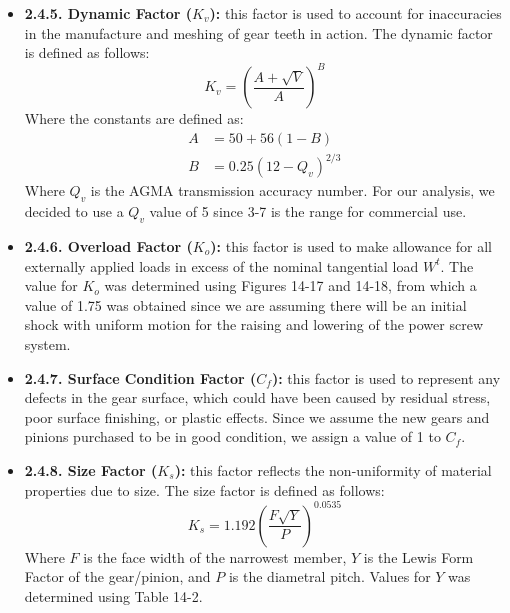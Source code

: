 \documentclass[letterpaper,12pt]{article}
\begin{document}
\begin{itemize}[leftmargin=3mm]
    \item \textbf{2.4.5. Dynamic Factor ($K_v$):} this factor is used to account for inaccuracies in the manufacture and meshing of gear teeth in action. The dynamic factor is defined as follows:
    \begin{equation}
        K_v = \left(\dfrac{A + \sqrt{V}}{A}\right)^B
    \end{equation}
    Where the constants are defined as:
    \begin{align*}
        A &= 50 + 56(1-B) \\
        B &= 0.25(12-Q_v)^{2/3}
    \end{align*}
    Where $Q_v$ is the AGMA transmission accuracy number. For our analysis, we decided to use a $Q_v$ value of 5 since 3-7 is the range for commercial use.
    
    \item \textbf{2.4.6. Overload Factor ($K_o$):} this factor is used to make allowance for all externally applied loads in excess of the nominal tangential load $W^t$. The value for $K_o$ was determined using Figures 14-17 and 14-18, from which a value of 1.75 was obtained since we are assuming there will be an initial shock with uniform motion for the raising and lowering of the power screw system.
    
    \item \textbf{2.4.7. Surface Condition Factor ($C_f$):} this factor is used to represent any defects in the gear surface, which could have been caused by residual stress, poor surface finishing, or plastic effects. Since we assume the new gears and pinions purchased to be in good condition, we assign a value of 1 to $C_f$.
    
    \item \textbf{2.4.8. Size Factor ($K_s$):} this factor reflects the non-uniformity of material properties due to size. The size factor is defined as follows:
    \begin{equation}
        K_s = 1.192 \left(\dfrac{F \sqrt{Y}}{P}\right)^{0.0535}
    \end{equation}
    Where $F$ is the face width of the narrowest member, $Y$ is the Lewis Form Factor of the gear/pinion, and $P$ is the diametral pitch. Values for $Y$ was determined using Table 14-2.
    

\end{itemize}
\end{document}

